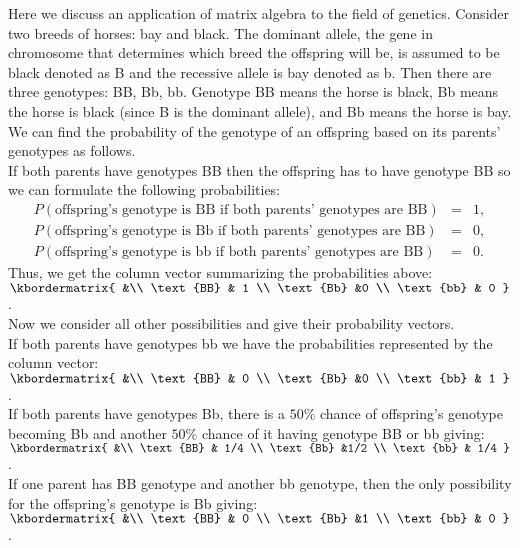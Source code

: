 \documentclass{ximera}
\author{Parisa Fatheddin}
\begin{document}
Here we discuss an application of matrix algebra to the field of genetics. Consider two breeds of horses: bay and black. The dominant allele, the gene in chromosome that determines which breed the offspring will be, is assumed to be black denoted as B and the recessive allele is bay denoted as b. Then there are three genotypes: BB, Bb, bb. Genotype BB means the horse is black, Bb means the horse is black (since B is the dominant allele), and Bb means the horse is bay. We can find the probability of the genotype of an offspring based on its parents' genotypes as follows. \\
If both parents have genotypes BB then the offspring has to have genotype BB so we can formulate the following probabilities: 
\begin{eqnarray*}
P\left(\text{offspring's genotype is BB if both parents' genotypes are BB}\right) &=& 1,\\
P\left(\text{offspring's genotype is Bb if both parents' genotypes are BB}\right) &=& 0,\\
P\left(\text{offspring's genotype is bb if both parents' genotypes are BB}\right) &=& 0.
\end{eqnarray*}
Thus, we get the column vector summarizing the probabilities above: $\kbordermatrix{ &\\
 \text{BB} & 1  \\
\text{Bb} &0  \\
\text{bb} & 0
}$.\\
Now we consider all other possibilities and give their probability vectors. \\
If both parents have genotypes bb we have the probabilities represented by the column vector: $\kbordermatrix{ &\\
 \text{BB} & 0  \\
\text{Bb} &0  \\
\text{bb} & 1
}$.\\
 If both parents have genotypes Bb, there is a $50\%$ chance of offspring's genotype becoming Bb and another $50\%$ chance of it having genotype BB or bb giving: $\kbordermatrix{ &\\
 \text{BB} & 1/4  \\
\text{Bb} &1/2  \\
\text{bb} & 1/4  
}$.\\
 If one parent has BB genotype and another bb genotype, then the only possibility for the offspring's genotype is Bb giving: $\kbordermatrix{ &\\
 \text{BB} & 0 \\
\text{Bb} &1  \\
\text{bb} & 0
}$.\\
\end{document}
